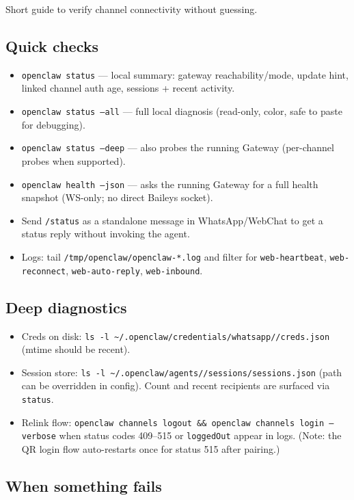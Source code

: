 Short guide to verify channel connectivity without guessing.

\subsection{Quick checks}


\begin{itemize}
  \item \texttt{openclaw status} — local summary: gateway reachability/mode, update hint, linked channel auth age, sessions + recent activity.
  \item \texttt{openclaw status --all} — full local diagnosis (read-only, color, safe to paste for debugging).
  \item \texttt{openclaw status --deep} — also probes the running Gateway (per-channel probes when supported).
  \item \texttt{openclaw health --json} — asks the running Gateway for a full health snapshot (WS-only; no direct Baileys socket).
  \item Send \texttt{/status} as a standalone message in WhatsApp/WebChat to get a status reply without invoking the agent.
  \item Logs: tail \texttt{/tmp/openclaw/openclaw-*.log} and filter for \texttt{web-heartbeat}, \texttt{web-reconnect}, \texttt{web-auto-reply}, \texttt{web-inbound}.
\end{itemize}


\subsection{Deep diagnostics}


\begin{itemize}
  \item Creds on disk: \texttt{ls -l \textasciitilde{}/.openclaw/credentials/whatsapp//creds.json} (mtime should be recent).
  \item Session store: \texttt{ls -l \textasciitilde{}/.openclaw/agents//sessions/sessions.json} (path can be overridden in config). Count and recent recipients are surfaced via \texttt{status}.
  \item Relink flow: \texttt{openclaw channels logout \&\& openclaw channels login --verbose} when status codes 409–515 or \texttt{loggedOut} appear in logs. (Note: the QR login flow auto-restarts once for status 515 after pairing.)
\end{itemize}


\subsection{When something fails}


